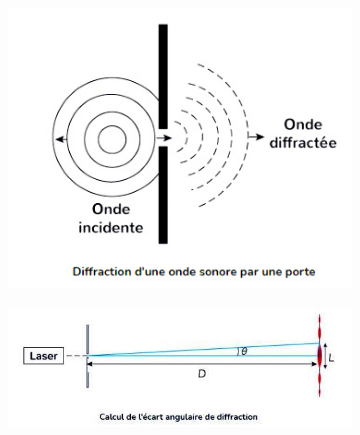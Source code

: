 \documentclass[11pt,a4paper]{article}
\begin{document}
\begin{figure}[H]
\centering
\begin{subfigure}{.27\textwidth}
  \centering
  \includegraphics[width=.95\linewidth]{imgs/p5/diffraction.png.jpg}  
\end{subfigure}
\begin{subfigure}{.7\textwidth}
  \centering
  \includegraphics[width=.95\linewidth]{imgs/p5/montageDiff.jpg}  
\end{subfigure}
\end{figure}
\end{document}
